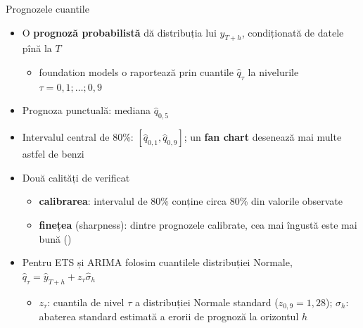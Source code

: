 \begin{frame}{Prognozele cuantile}
\itemsize{\footnotesize}
\begin{itemize}
    \item O \textbf{prognoză probabilistă} dă distribuția lui $y_{T+h}$, condiționată de datele pînă la $T$
    \begin{itemize}
        \item foundation models o raportează prin cuantile $\hat q_\tau$ la nivelurile $\tau = 0{,}1; \dots; 0{,}9$
    \end{itemize}
    \item Prognoza punctuală: mediana $\hat q_{0{,}5}$
    \item Intervalul central de 80\%: $[\hat q_{0{,}1}, \hat q_{0{,}9}]$; un \textbf{fan chart} desenează mai multe astfel de benzi
    \item Două calități de verificat
    \begin{itemize}
        \item \textbf{calibrarea}: intervalul de 80\% conține circa 80\% din valorile observate
        \item \textbf{finețea} (sharpness): dintre prognozele calibrate, cea mai îngustă este mai bună ()
    \end{itemize}
    \item Pentru ETS și ARIMA folosim cuantilele distribuției Normale, $\hat q_\tau = \hat y_{T+h} + z_\tau \hat\sigma_h$
    \begin{itemize}
        \item $z_\tau$: cuantila de nivel $\tau$ a distribuției Normale standard ($z_{0{,}9} = 1{,}28$); $\hat\sigma_h$: abaterea standard estimată a erorii de prognoză la orizontul $h$
    \end{itemize}
\end{itemize}
\end{frame}

